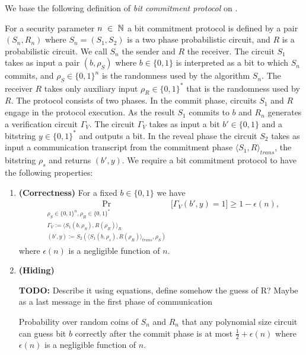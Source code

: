 We base the following definition of \textit{bit commitment protocol} on \cite{LectureNotesComThCrypto}.
\begin{definition}
  \label{def:bit_commitment}
For a security parameter $n~\in~\mathbb{N}$ a \textnormal{bit commitment protocol} is defined by a pair $(S_n, R_n)$
where $S_n = (S_1, S_2)$ is a two phase probabilistic circuit, and $R$ is a probabilistic circuit.
We call $S_n$ the sender and $R$ the receiver. The circuit $S_1$ takes as input a pair $(b, \rho_S)$
where $b \in \{0,1\}$ is interpreted as a bit to which $S_n$
commits, and $\rho_S \in \{0,1\}^{n}$ is the randomness used by the algorithm $S_n$.
The receiver $R$ takes only auxiliary input $\rho_R \in \{0,1\}^{*}$ that is the randomness used by $R$.
The protocol consists of two phases. In the \textnormal{commit phase}, circuits $S_1$ and $R$ engage in the protocol execution.
As the result $S_1$ commits to $b$ and $R_n$ generates a verification circuit $\Gamma_V$.
The circuit $\Gamma_V$ takes as input a bit $b' \in \{0,1\}$ and a bitstring $y \in \{0,1\}^{*}$ and outputs a bit.
In the \textnormal{reveal phase} the circuit $S_2$ takes as input a communication transcript from the commitment phase
$\langle S_1, R \rangle_{\mathit{trans}}$, the bitstring $\rho_s$ and returns $(b', y)$.
We require a bit commitment protocol to have the following properties:
\begin{enumerate}[]
\item{\textnormal{\textbf{(Correctness)}}} For a fixed $b \in \{0,1\}$ we have
  \begin{align*}
    \underset{\substack{\rho_S \in \{0,1\}^{n}, \rho_R \in \{0,1\}^{*} \\
        \Gamma_V := \langle S_1(b,\rho_S), R(\rho_R) \rangle_{R} \\
        (b',y) := S_2(\langle S_1(b,\rho_s), R(\rho_R) \rangle_{\mathit{trans}},\rho_S)}}{\Pr}\Big[\Gamma_V(b',y) = 1 \Big] \geq 1 - \epsilon(n),
  \end{align*}
where $\epsilon(n)$ is a negligible function of $n$.
\item{\textnormal{\textbf{(Hiding)}}}
  \begin{todo}
    \textbf{TODO:} Describe it using equations, define somehow the guess of R? Maybe as a last message in the first phase of communication
  \end{todo}
  Probability over random coins of $S_n$ and $R_n$ that any polynomial size circuit
  can guess bit $b$ correctly after the commit phase is at most $\frac{1}{2} + \epsilon(n)$ where $\epsilon(n)$ is a negligible function of $n$.

\end{enumerate}
\end{definition}
